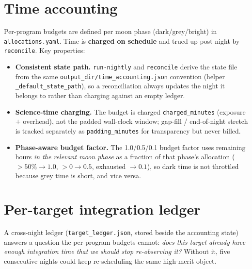 \documentclass[11pt,letterpaper]{article}
\begin{document}
\section{Time accounting}\label{sec:accounting}
Per-program budgets are defined per moon phase (dark/grey/bright) in \texttt{allocations.yaml}.
Time is \textbf{charged on schedule} and trued-up post-night by \texttt{reconcile}.
Key properties:
\begin{itemize}[nosep]
  \item \textbf{Consistent state path.} \texttt{run-nightly} and \texttt{reconcile} derive
  the state file from the same \texttt{output\_dir/time\_accounting.json} convention (helper
  \texttt{\_default\_state\_path}), so a reconciliation always updates the night it belongs to
  rather than charging against an empty ledger.
  \item \textbf{Science-time charging.} The budget is charged \texttt{charged\_minutes}
  (exposure $+$ overhead), not the padded wall-clock window; gap-fill / end-of-night stretch
  is tracked separately as \texttt{padding\_minutes} for transparency but never billed.
  \item \textbf{Phase-aware budget factor.} The 1.0/0.5/0.1 budget factor uses remaining
  hours \emph{in the relevant moon phase} as a fraction of that phase's allocation
  ($>50\%\rightarrow1.0$, $>0\rightarrow0.5$, exhausted $\rightarrow0.1$), so dark time is
  not throttled because grey time is short, and vice versa.
\end{itemize}

\section{Per-target integration ledger}\label{sec:ledger}
A cross-night ledger (\texttt{target\_ledger.json}, stored beside the accounting state)
answers a question the per-program budgets cannot: \emph{does this target already have enough
integration time that we should stop re-observing it?} Without it, five consecutive nights
could keep re-scheduling the same high-merit object.
\end{document}

